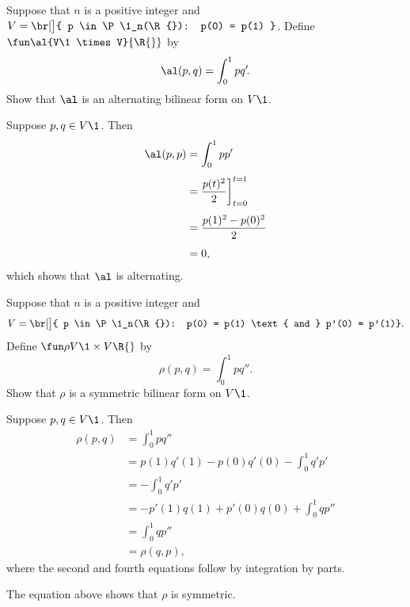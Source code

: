 \exercise
Suppose that $n$ is a positive integer and $V = \br[\big]{ p \in \P\1_n(\R{}): p(0) = p(1) }$.
Define $\fun \al {V\1 \times V} {\R{}}$ by
\[
\al(p,q) = \int_0^1 p q'\!.
\]
Show that $\al$ is an alternating bilinear form on $V\1$.

\begin{Solution}
Suppose $p, q \in V\1$. Then
\begin{align*}
\al(p, p) & = \int_0^1 p p' \\[4bp]
&= \frac{p(t)^2}{2} \bigg]_{t=0}^{t=1} \\[4bp]
&= \frac{ p(1)^2 - p(0)^2 }{2} \\[4bp]
&=0,
\end{align*}
which shows that $\al$ is alternating.
\end{Solution}

\exercise
Suppose that $n$ is a positive integer and
\[
V = \br[\big]{ p \in \P\1_n(\R{}): p(0) = p(1) \text{ and } p'(0) = p'(1)}.
\]
Define $\fun \rho {V\1 \times V} {\R{}}$ by
\[
\rho(p,q) = \int_0^1 p q''\!.
\]
Show that $\rho$ is a symmetric bilinear form on $V\1$.

\begin{Solution}
Suppose $p, q \in V\1$. Then
\begin{align*}
\rho(p, q) & = \int_0^1 p q'' \\[4bp]
&= p(1) q'(1) - p(0)q'(0) - \int_0^1 q' p' \\[4bp]
&= - \int_0^1 q' p' \\[4bp]
&= -p'(1) q(1) + p'(0)q(0) + \int_0^1 q p'' \\[4bp]
&= \int_0^1 q p'' \\[4bp]
&= \rho(q, p),
\end{align*}
where the second and fourth equations follow by integration by parts.

The equation above shows that $\rho$ is symmetric.
\end{Solution}

